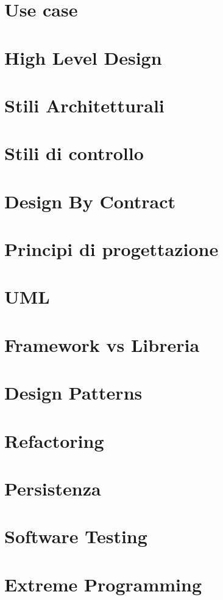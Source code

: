 \documentclass[10pt]{article}
\begin{document}
\newpage
\section{Use case}


\section{High Level Design}


\section{Stili Architetturali}


\section{Stili di controllo}


\newpage
\section{Design By Contract}


\newpage
\section{Principi di progettazione}


\section{UML}


\section{Framework vs Libreria}


\newpage
\section{Design Patterns}


\newpage
\section{Refactoring}


\newpage
\section{Persistenza}


\section{Software Testing}


\section{Extreme Programming}

\end{document}
